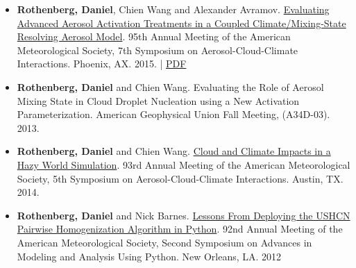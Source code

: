 \documentclass[11pt,letterpaper]{article}
\begin{document}
\begin{itemize}[itemindent=-10pt]
 \item[$\dagger$] \textbf{Rothenberg, Daniel}, Chien Wang and Alexander Avramov. \href{https://ams.confex.com/ams/95Annual/webprogram/Paper268747.html}{Evaluating Advanced Aerosol Activation Treatments in a Coupled Climate/Mixing-State Resolving Aerosol Model}. 95th Annual Meeting of the American Meteorological Society, 7th Symposium on Aerosol-Cloud-Climate Interactions. Phoenix, AX. 2015. | \href{https://figshare.com/articles/Evaluating_Advanced_Aerosol_Activation_Treatments_in_a_Coupled_Climate_Mixing-State_Resolving_Aerosol_Model/3475226}{PDF}

 \item \textbf{Rothenberg, Daniel} and Chien Wang. Evaluating the Role of Aerosol Mixing State in Cloud Droplet Nucleation using a New Activation Parameterization. American Geophysical Union Fall Meeting, (A34D-03). 2013.

 \item \textbf{Rothenberg, Daniel} and Chien Wang. \href{http://figshare.com/articles/AMS_2014_Evaluating_the_Role_of_Aerosol_Mixing_State_in_Cloud_Droplet_Nucleation_towards_Developing_a_New_Activation_Parameterization/918655}{Cloud and Climate Impacts in a Hazy World Simulation}. 93rd Annual Meeting of the American Meteorological Society, 5th Symposium on Aerosol-Cloud-Climate Interactions. Austin, TX. 2014.

 \item \textbf{Rothenberg, Daniel} and Nick Barnes. \href{https://ams.confex.com/ams/92Annual/webprogram/Paper198219.html}{Lessons From Deploying the USHCN Pairwise Homogenization Algorithm in Python}. 92nd Annual Meeting of the American Meteorological Society, Second Symposium on Advances in Modeling and Analysis Using Python. New Orleans, LA. 2012
\end{itemize}
\end{document}
